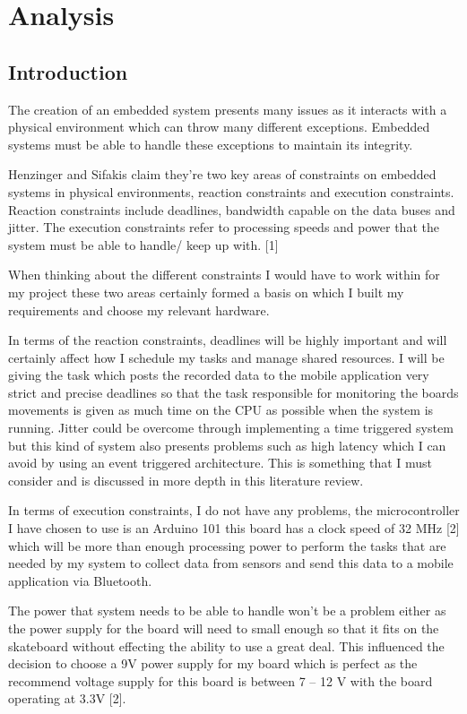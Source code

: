 \chapter{Analysis}\label{analysis}

\section{Introduction}\label{analysis:intro}
The creation of an embedded system presents many issues as it interacts with a physical environment which can throw many different exceptions. Embedded systems must be able to handle these exceptions to maintain its integrity.

Henzinger and Sifakis claim they’re two key areas of constraints on embedded systems in physical environments, reaction constraints and execution constraints. Reaction constraints include deadlines, bandwidth capable on the data buses and jitter. The execution constraints refer to processing speeds and power that the system must be able to handle/ keep up with. [1]

When thinking about the different constraints I would have to work within for my project these two areas certainly formed a basis on which I built my requirements and choose my relevant hardware.

In terms of the reaction constraints, deadlines will be highly important and will certainly affect how I schedule my tasks and manage shared resources. I will be giving the task which posts the recorded data to the mobile application very strict and precise deadlines so that the task responsible for monitoring the boards movements is given as much time on the CPU as possible when the system is running. Jitter could be overcome through implementing a time triggered system but this kind of system also presents problems such as high latency which I can avoid by using an event triggered architecture. This is something that I must consider and is discussed in more depth in this literature review.

In terms of execution constraints, I do not have any problems, the microcontroller I have chosen to use is an Arduino 101 this board has a clock speed of 32 MHz [2] which will be more than enough processing power to perform the tasks that are needed by my system to collect data from sensors and send this data to a mobile application via Bluetooth. 

The power that system needs to be able to handle won’t be a problem either as the power supply for the board will need to small enough so that it fits on the skateboard without effecting the ability to use a great deal. This influenced the decision to choose a 9V power supply for my board which is perfect as the recommend voltage supply for this board is between 7 – 12 V with the board operating at 3.3V [2].

